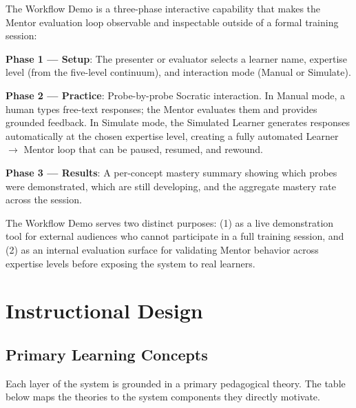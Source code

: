 \documentclass[11pt,letterpaper]{article}
\newcommand{\arrowto}{$\rightarrow$}
\begin{document}
The Workflow Demo is a three-phase interactive capability that makes the Mentor evaluation loop observable and inspectable outside of a formal training session:

\textbf{Phase 1 --- Setup}: The presenter or evaluator selects a learner name, expertise level (from the five-level continuum), and interaction mode (Manual or Simulate).

\textbf{Phase 2 --- Practice}: Probe-by-probe Socratic interaction. In Manual mode, a human types free-text responses; the Mentor evaluates them and provides grounded feedback. In Simulate mode, the Simulated Learner generates responses automatically at the chosen expertise level, creating a fully automated Learner \arrowto{} Mentor loop that can be paused, resumed, and rewound.

\textbf{Phase 3 --- Results}: A per-concept mastery summary showing which probes were demonstrated, which are still developing, and the aggregate mastery rate across the session.

The Workflow Demo serves two distinct purposes: (1) as a live demonstration tool for external audiences who cannot participate in a full training session, and (2) as an internal evaluation surface for validating Mentor behavior across expertise levels before exposing the system to real learners.

\section{Instructional Design}
\label{sec:instructional-design}

\subsection{Primary Learning Concepts}
\label{sec:primary-learning-concepts}

Each layer of the system is grounded in a primary pedagogical theory. The table below maps the theories to the system components they directly motivate.
\end{document}

